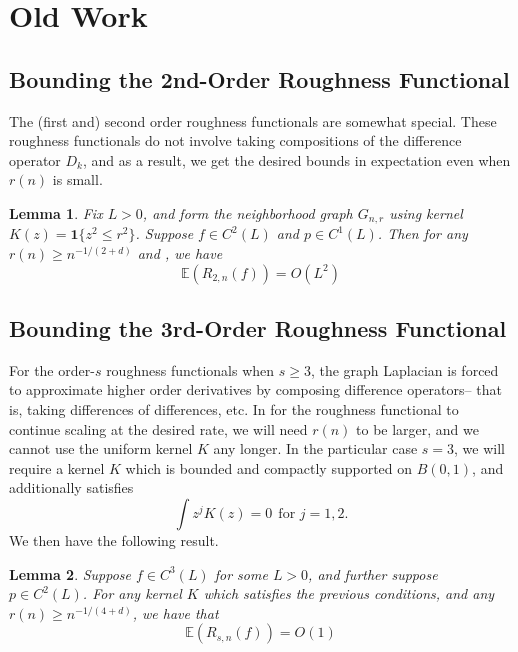 \documentclass{article}
\newcommand{\1}{\mathbf{1}}
\newcommand{\Ebb}{\mathbb{E}}
\theoremstyle{alden}
\theoremstyle{aldenthm}
\newtheorem{lemma}{Lemma}
\theoremstyle{definition}
\theoremstyle{remark}
\begin{document}
\clearpage

\section{Old Work}

\subsection{Bounding the 2nd-Order Roughness Functional}
The (first and) second order roughness functionals are somewhat special. These roughness functionals do not involve taking compositions of the difference operator $D_k$, and as a result, we get the desired bounds in expectation even when $r(n)$ is small. 
\begin{lemma}
	\label{lem:2nd_order_roughness_functional}
	Fix $L > 0$, and form the neighborhood graph $G_{n,r}$ using kernel $K(z) = \1\{z^2 \leq r^2\}$. Suppose $f \in C^2(L)$ and $p \in C^1(L)$. Then for any $r(n) \geq n^{-1/(2+d)}$ and , we have
	\begin{equation*}
	\Ebb(R_{2,n}(f)) = O(L^2)
	\end{equation*}
\end{lemma}

\subsection{Bounding the 3rd-Order Roughness Functional}

For the order-$s$ roughness functionals when $s \geq 3$, the graph Laplacian is forced to approximate higher order derivatives by composing difference operators-- that is, taking differences of differences, etc. In for the roughness functional to continue scaling at the desired rate, we will need $r(n)$ to be larger, and we cannot use the uniform kernel $K$ any longer. In the particular case $s = 3$, we will require a kernel $K$ which is bounded and compactly supported on $B(0,1)$, and additionally satisfies
\begin{equation*}
\int z^j K(z) = 0~~\textrm{for $j = 1,2$.}
\end{equation*}
We then have the following result.
\begin{lemma}
	\label{lem:3rd_order_roughness_functional}
	Suppose $f \in C^{3}(L)$ for some $L > 0$, and further suppose $p \in C^{2}(L)$. For any kernel $K$ which satisfies the previous conditions, and any $r(n) \geq n^{-1/(4+d)}$, we have that
	\begin{equation*}
	\Ebb(R_{s,n}(f)) = O(1)
	\end{equation*} 
\end{lemma}
\end{document}
